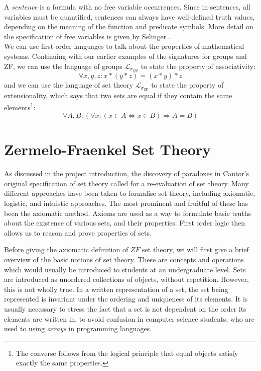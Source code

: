 \documentclass[11pt]{report}
\theoremstyle{definition}
\theoremstyle{theorem}
\theoremstyle{lemma}
\begin{document}
A \emph{sentence} is a formula with no free variable occurrences.
Since in sentences, all variables must be quantified, sentences can always have well-defined truth values, depending on the meaning of the function and predicate symbols.
More detail on the specification of free variables is given by Selinger \cite[ch.~1.9]{selinger}.\\

\noindent
We can use first-order languages to talk about the properties of mathematical systems.
Continuing with our earlier examples of the signatures for groups and ZF, we can use the language of groups $\mathcal{L}_{\sigma_{\text{grp}}}$ to state the property of associativity:
$$\forall x,y,z: x*(y*z) = (x*y)*z$$
and we can use the language of set theory $\mathcal{L}_{\sigma_{\text{ZF}}}$ to state the property of extensionality, which says that two sets are equal if they contain the same elements\footnote{The converse follows from the logical principle that equal objects satisfy exactly the same properties.}:
$$\forall A,B: (\forall x:(x\in A \Leftrightarrow x\in B) \Rightarrow A = B)$$

\section{Zermelo-Fraenkel Set Theory}
As discussed in the project introduction, the discovery of paradoxes in Cantor's original specification of set theory called for a re-evaluation of set theory.
Many different approaches have been taken to formalise set theory, including axiomatic, logistic, and intuistic approaches.
The most prominent and fruitful of these has been the axiomatic method.
Axioms are used as a way to formulate basic truths about the existence of various sets, and their properties.
First order logic then allows us to reason and prove properties of sets.

Before giving the axiomatic definition of $\mathit{ZF}$ set theory, we will first give a brief overview of the basic notions of set theory.
These are concepts and operations which would usually be introduced to students at an undergraduate level.
Sets are introduced as unordered collections of objects, without repetition. 
However, this is not wholly true. 
In a written representation of a set, the set being represented is invariant under the ordering and uniqueness of its elements.
It is usually necessary to stress the fact that a set is not dependent on the order its elements are written in, to avoid confusion in computer science students, who are used to using \emph{arrays} in programming languages.
\end{document}
